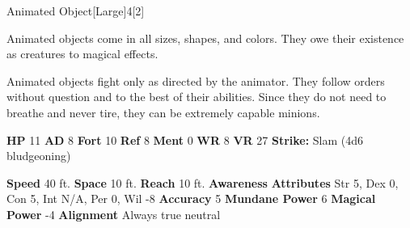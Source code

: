   
  \begin{monsection}{Animated Object}[Large]{4}[2]
    \vspace{-1em}\vspace{-1em}
    \vspace{0em}

    
    Animated objects come in all sizes, shapes, and colors. They owe their existence as creatures to magical effects.

    Animated objects fight only as directed by the animator. They follow orders without question and to the best of their abilities. Since they do not need to breathe and never tire, they can be extremely capable minions.
  
    

    \begin{spellcontent}
      \begin{spelltargetinginfo}
        \pari \textbf{HP} 11 \monsep
          \textbf{AD} 8 \monsep
          \textbf{Fort} 10 \monsep
          \textbf{Ref} 8 \monsep
          \textbf{Ment} 0
        \pari \textbf{WR} 8 \monsep
        \textbf{VR} 27
        \pari \textbf{Strike:}
            Slam  (4d6 bludgeoning)
      \end{spelltargetinginfo}
    \end{spellcontent}
    \begin{monsterfooter}
      \pari \textbf{Speed} 40 ft. \monsep
        \textbf{Space} 10 ft. \monsep
        \textbf{Reach} 10 ft.
      \pari \textbf{Awareness} 
      \pari \textbf{Attributes}
        Str 5, Dex 0,
        Con 5, Int N/A,
        Per 0, Wil -8
      \pari \textbf{Accuracy} 5 \monsep
        \textbf{Mundane Power} 6 \monsep
      \textbf{Magical Power} -4
      \pari \textbf{Alignment} Always true neutral
    \end{monsterfooter}
  \end{monsection}
  
